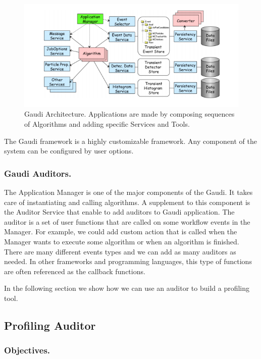 \documentclass[a4paper]{jpconf}
\begin{document}
\begin{figure}[H]
\begin{minipage}{\textwidth}
\includegraphics[width=\textwidth]{figs/fig07.png}
\caption{\label{fig07}Gaudi Architecture. Applications are made by composing sequences of Algorithms and adding 
specific Services and Tools.}
\end{minipage}
\end{figure}

The Gaudi framework is a highly customizable framework. Any component of the system can be configured by user options. 

\subsubsection{Gaudi Auditors.}

The Application Manager is one of the major components of the Gaudi. It takes care of instantiating and
 calling algorithms. A supplement to this component  is the Auditor Service that enable to add auditors to 
 Gaudi application. The auditor is a set of user functions that are called on some workflow events in the Manager. 
 For example, we could add custom action that is called when the Manager wants to execute some algorithm or when 
 an algorithm is finished.  There are many different events types and we can add as many auditors as needed. 
 In other frameworks and programming languages, this type of functions are often referenced as the callback functions.

In the following section we show how we can use an auditor to build a profiling tool.

\subsection{Profiling Auditor}

\subsubsection{Objectives.}
\end{document}
